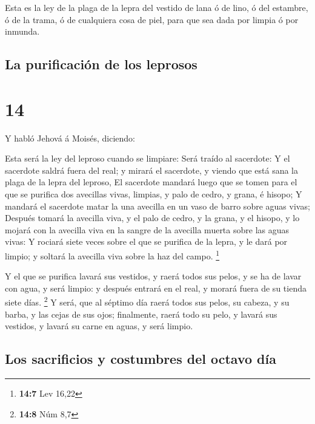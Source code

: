  Esta es la ley de la plaga de la lepra del vestido de
lana ó de lino, ó del estambre, ó de la trama, ó de cualquiera cosa de
piel, para que sea dada por limpia ó por inmunda.

\hypertarget{la-purificaciuxf3n-de-los-leprosos}{%
\subsection{La purificación de los
leprosos}\label{la-purificaciuxf3n-de-los-leprosos}}

\hypertarget{section-13}{%
\section{14}\label{section-13}}

 Y habló Jehová á Moisés, diciendo:

 Esta será la ley del leproso cuando se limpiare: Será
traído al sacerdote:  Y el sacerdote saldrá fuera del
real; y mirará el sacerdote, y viendo que está sana la plaga de la lepra
del leproso,  El sacerdote mandará luego que se tomen para
el que se purifica dos avecillas vivas, limpias, y palo de cedro, y
grana, é hisopo;  Y mandará el sacerdote matar la una
avecilla en un vaso de barro sobre aguas vivas;  Después
tomará la avecilla viva, y el palo de cedro, y la grana, y el hisopo, y
lo mojará con la avecilla viva en la sangre de la avecilla muerta sobre
las aguas vivas:  Y rociará siete veces sobre el que se
purifica de la lepra, y le dará por limpio; y soltará la avecilla viva
sobre la haz del campo. \footnote{\textbf{14:7} Lev 16,22}

 Y el que se purifica lavará sus vestidos, y raerá todos
sus pelos, y se ha de lavar con agua, y será limpio: y después entrará
en el real, y morará fuera de su tienda siete días. \footnote{\textbf{14:8}
  Núm 8,7}  Y será, que al séptimo día raerá todos sus
pelos, su cabeza, y su barba, y las cejas de sus ojos; finalmente, raerá
todo su pelo, y lavará sus vestidos, y lavará su carne en aguas, y será
limpio.

\hypertarget{los-sacrificios-y-costumbres-del-octavo-duxeda}{%
\subsection{Los sacrificios y costumbres del octavo
día}\label{los-sacrificios-y-costumbres-del-octavo-duxeda}}

